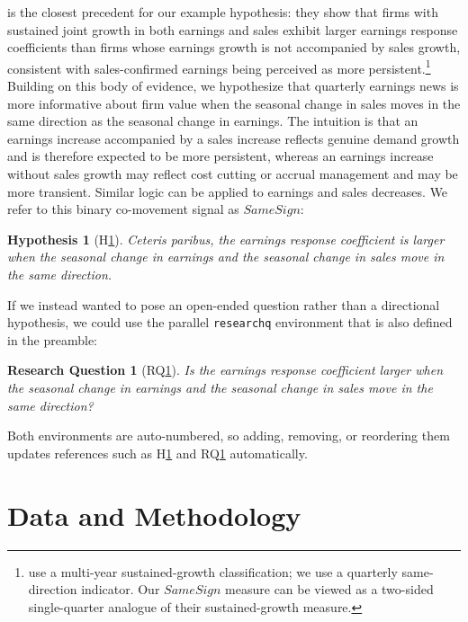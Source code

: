\documentclass[english,12pt]{article}
\newtheorem{hyp}{Hypothesis}
\newtheorem{researchq}{Research Question}
\begin{document}
\citet{ghosh2005sustained} is the closest precedent for our example hypothesis: they show that firms with sustained joint growth in both earnings and sales exhibit larger earnings response coefficients than firms whose earnings growth is not accompanied by sales growth, consistent with sales-confirmed earnings being perceived as more persistent.\footnote{\citet{ghosh2005sustained} use a multi-year sustained-growth classification; we use a quarterly same-direction indicator. Our $SameSign$ measure can be viewed as a two-sided single-quarter analogue of their sustained-growth measure.} Building on this body of evidence, we hypothesize that quarterly earnings news is more informative about firm value when the seasonal change in sales moves in the same direction as the seasonal change in earnings. The intuition is that an earnings increase accompanied by a sales increase reflects genuine demand growth and is therefore expected to be more persistent, whereas an earnings increase without sales growth may reflect cost cutting or accrual management and may be more transient. Similar logic can be applied to earnings and sales decreases. We refer to this binary co-movement signal as $SameSign$:

\begin{hyp}[H\ref{hyp:samesign}] \label{hyp:samesign}
Ceteris paribus, the earnings response coefficient is larger when the seasonal change in earnings and the seasonal change in sales move in the same direction.
\end{hyp}

If we instead wanted to pose an open-ended question rather than a directional hypothesis, we could use the parallel \texttt{researchq} environment that is also defined in the preamble:

\begin{researchq}[RQ\ref{researchq:size}] \label{researchq:size}
Is the earnings response coefficient larger when the seasonal change in earnings and the seasonal change in sales move in the same direction?
\end{researchq}

Both environments are auto-numbered, so adding, removing, or reordering them updates references such as H\ref{hyp:samesign} and RQ\ref{researchq:size} automatically.


\section{Data and Methodology}\label{section-method}
\end{document}
